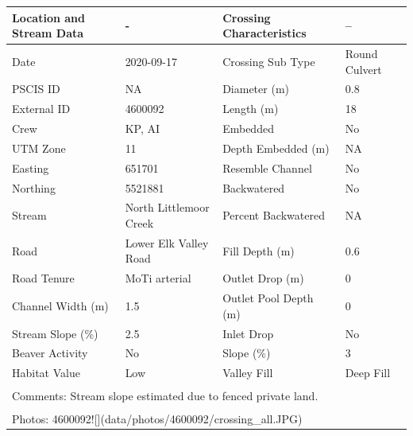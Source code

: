 \documentclass[
]{book}
\begin{document}
\begin{tabular}{llll}
\toprule
Location and Stream Data & - & Crossing Characteristics & --\\
\midrule
Date & 2020-09-17 & Crossing Sub Type & Round Culvert\\
PSCIS ID & NA & Diameter (m) & 0.8\\
External ID & 4600092 & Length (m) & 18\\
Crew & KP, AI & Embedded & No\\
UTM Zone & 11 & Depth Embedded (m) & NA\\
\addlinespace
Easting & 651701 & Resemble Channel & No\\
Northing & 5521881 & Backwatered & No\\
Stream & North Littlemoor Creek & Percent Backwatered & NA\\
Road & Lower Elk Valley Road & Fill Depth (m) & 0.6\\
Road Tenure & MoTi arterial & Outlet Drop (m) & 0\\
\addlinespace
Channel Width (m) & 1.5 & Outlet Pool Depth (m) & 0\\
Stream Slope (\%) & 2.5 & Inlet Drop & No\\
Beaver Activity & No & Slope (\%) & 3\\
Habitat Value & Low & Valley Fill & Deep Fill\\
\bottomrule
\multicolumn{4}{l}{\textsuperscript{} Comments: Stream slope estimated due to fenced private land.}\\
\multicolumn{4}{l}{\textsuperscript{} Photos: 4600092![](data/photos/4600092/crossing\_all.JPG)}\\
\end{tabular}
\end{document}
